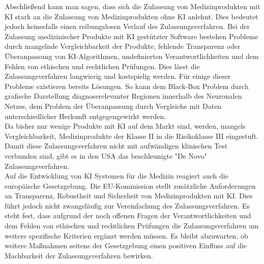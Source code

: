 Abschließend kann man sagen, dass sich die Zulassung von Medizinprodukten mit KI stark an die Zulassung von Medizinprodukten ohne KI anlehnt. Dies bedeutet jedoch keinesfalls einen reibungslosen Verlauf des Zulassungsverfahren. 
Bei der Zulassung medizinischer Produkte mit KI gestützter Software bestehen Probleme durch mangelnde Vergleichbarkeit der Produkte, fehlende Transparenz oder Überanpassung von KI-Algorithmen,
undefinierten Verantwortlichkeiten und dem Fehlen von ethischen und rechtlichen Prüfungen. Dies lässt die Zulassungsverfahren langwierig und kostspielig werden.
Für einige dieser Probleme existieren bereits Lösungen. So kann dem Black-Box Problem durch grafische Darstellung diagnoserelevanter Regionen innerhalb des Neuronalen Netzes, dem Problem der Überanpassung durch Vergleiche mit Daten unterschiedlicher Herkunft entgegengewirkt werden.\\ 
Da bisher nur wenige Produkte mit KI auf dem Markt sind, werden, mangels Vergleichbarkeit, Medizinprodukte der Klasse II in die Risikoklasse III eingestuft. Damit diese Zulassungsverfahren nicht mit aufwändigen klinischen Test verbunden sind, gibt es in den USA das beschleunigte "De Novo" Zulassungsverfahren.\\
Auf die Entwicklung von KI Systemen für die Medizin reagiert auch die europäische Gesetzgebung. Die EU-Kommission stellt zusätzliche Anforderungen an Transparenz, Robustheit und Sicherheit von Medizinprodukten mit KI. Dies führt jedoch nicht zwangsläufig zur Vereinfachung des Zulassungsverfahren. 
Es steht fest, dass aufgrund der noch offenen Fragen der  Verantwortlichkeiten und dem Fehlen von ethischen und rechtlichen Prüfungen die Zulassungsverfahren um weitere spezifische Kriterien ergänzt werden müssen. 
Es bleibt abzuwarten, ob weitere Maßnahmen seitens der Gesetzgebung einen positiven Einfluss auf die Machbarkeit der Zulassungsverfahren bewirken.


